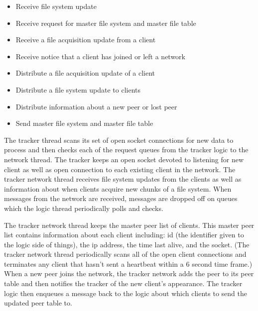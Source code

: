 
\begin{itemize}
	\item Receive file system update
	\item Receive request for master file system and master file table
	\item Receive a file acquisition update from a client
	\item Receive notice that a client has joined or left a network
\end{itemize}

\begin{itemize}
	\item Distribute a file acquisition update of a client
	\item Distribute a file system update to clients
	\item Distribute information about a new peer or lost peer
	\item Send master file system and master file table
\end{itemize}

The tracker thread scans its set of open socket connections for new data to process and then checks each of the request queues from the tracker logic to the network thread. The tracker keeps an open socket devoted to listening for new client as well as open connection to each existing client in the network. The tracker network thread receives file system updates from the clients as well as information about when clients acquire new chunks of a file system. When messages from the network are received, messages are dropped off on queues which the logic thread periodically polls and checks.

The tracker network thread keeps the master peer list of clients. This master peer list contains information about each client including: id (the identifier given to the logic side of things), the ip address, the time last alive, and the socket. (The tracker network thread periodically scans all of the open client connections and terminates any client that hasn't sent a heartbeat within a 6 second time frame.) When a new peer joins the network, the tracker network adds the peer to its peer table and then notifies the tracker of the new client's appearance. The tracker logic then enqueues a message back to the logic about which clients to send the updated peer table to. 
